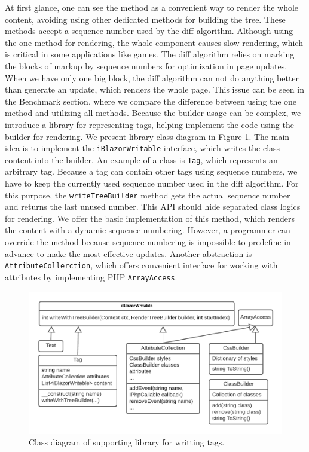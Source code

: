 At first glance, one can see the method as a convenient way to render the whole content, avoiding using other dedicated methods for building the tree.
These methods accept a sequence number used by the diff algorithm. 
Although using the one method for rendering, the whole component causes slow rendering, which is critical in some applications like games.
The diff algorithm relies on marking the blocks of markup by sequence numbers for optimization in page updates.
When we have only one big block, the diff algorithm can not do anything better than generate an update, which renders the whole page. 
This issue can be seen in the Benchmark section, where we compare the difference between using the one method and utilizing all methods.
Because the builder usage can be complex, we introduce a library for representing tags, helping implement the code using the builder for rendering.
We present library class diagram in Figure \ref{img16:diagram}.
The main idea is to implement the \texttt{iBlazorWritable} interface, which writes the class content into the builder.
An example of a class is \texttt{Tag}, which represents an arbitrary tag.
Because a tag can contain other tags using sequence numbers, we have to keep the currently used sequence number used in the diff algorithm.
For this purpose, the \texttt{writeTreeBuilder} method gets the actual sequence number and returns the last unused number.
This API should hide separated class logics for rendering.
We offer the basic implementation of this method, which renders the content with a dynamic sequence numbering. 
However, a programmer can override the method because sequence numbering is impossible to predefine in advance to make the most effective updates.
Another abstraction is \texttt{AttributeCollerction}, which offers convenient interface for working with attributes by implementing PHP \texttt{ArrayAccess}.
\par
\begin{figure}\centering
\includegraphics[scale=0.8]{./img/ComponentLibrary}
\caption{Class diagram of supporting library for writting tags.}
\label{img16:diagram}
\end{figure} 
